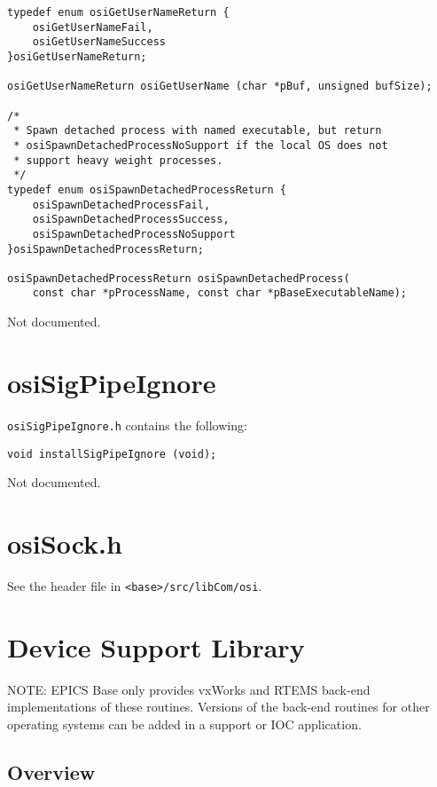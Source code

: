 \begin{verbatim}
typedef enum osiGetUserNameReturn {
    osiGetUserNameFail,
    osiGetUserNameSuccess
}osiGetUserNameReturn;

osiGetUserNameReturn osiGetUserName (char *pBuf, unsigned bufSize);

/*
 * Spawn detached process with named executable, but return
 * osiSpawnDetachedProcessNoSupport if the local OS does not
 * support heavy weight processes.
 */
typedef enum osiSpawnDetachedProcessReturn {
    osiSpawnDetachedProcessFail,
    osiSpawnDetachedProcessSuccess,
    osiSpawnDetachedProcessNoSupport
}osiSpawnDetachedProcessReturn;

osiSpawnDetachedProcessReturn osiSpawnDetachedProcess(
    const char *pProcessName, const char *pBaseExecutableName);

\end{verbatim}

Not documented.

\section{osiSigPipeIgnore}

\verb|osiSigPipeIgnore.h| contains the following:

\begin{verbatim}
void installSigPipeIgnore (void);
\end{verbatim}

Not documented.

\section{osiSock.h}

See the header file in \verb|<base>/src/libCom/osi|.

\section{ Device Support Library}

NOTE: EPICS Base only provides vxWorks and RTEMS back-end implementations of these routines. Versions of the 
back-end routines for other operating systems can be added in a support or IOC application.

\subsection{Overview}

